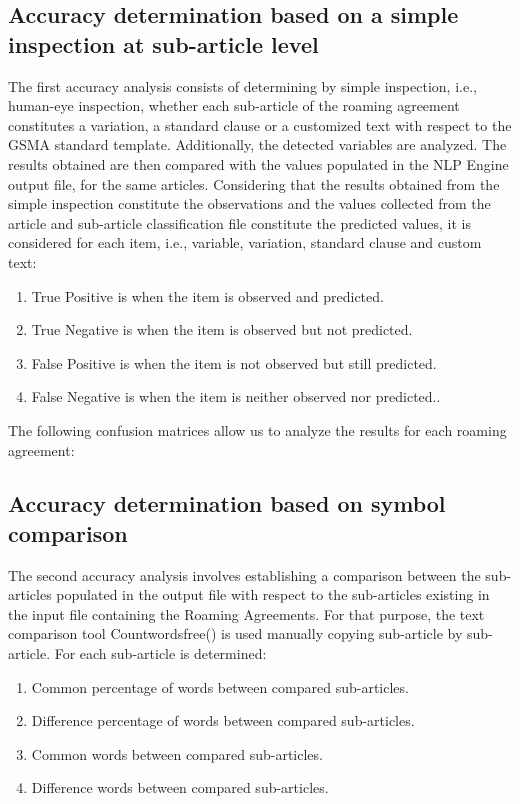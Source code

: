 \documentclass[conference]{style/IEEEtran}
\begin{document}
\subsection{Accuracy determination based on a simple inspection at sub-article level}
The first accuracy analysis consists of determining by simple inspection, i.e., human-eye inspection, whether each sub-article of the roaming agreement constitutes a variation, a standard clause or a customized text with respect to the GSMA standard template. Additionally, the detected variables are analyzed. The results obtained are then compared with the values populated in the NLP Engine output file, for the same articles. Considering that the results obtained from the simple inspection constitute the observations and the values collected from the article and sub-article classification file constitute the predicted values, it is considered for each item, i.e., variable, variation, standard clause and custom text:
\begin{enumerate}
\item True Positive is when the item is observed and predicted.
\item True Negative is when the item is observed but not predicted.
\item False Positive is when the item is not observed but still predicted.
\item False Negative is when the item is neither observed nor predicted..
\end{enumerate}

The following confusion matrices allow us to analyze the results for each roaming agreement:

\subsection{Accuracy determination based on symbol comparison}
The second accuracy analysis involves establishing a comparison between the sub-articles populated in the output file with respect to the sub-articles existing in the input file containing the Roaming Agreements. For that purpose, the text comparison tool Countwordsfree(\cite{countwordsfree}) is used manually copying sub-article by sub-article. For each sub-article is determined:

 \begin{enumerate}
\item Common percentage of words between compared sub-articles.
\item Difference percentage of words between compared sub-articles.
\item Common words between compared sub-articles.
\item Difference words between compared sub-articles.
\end{enumerate}
\end{document}
